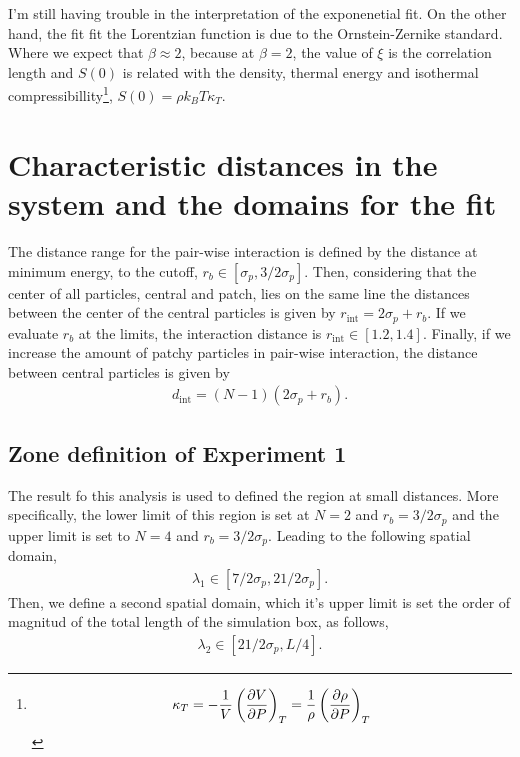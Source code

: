 \documentclass[a4paper]{tufte-handout} %
\begin{document}
I'm still having trouble in the interpretation of the exponenetial fit.
On the other hand, the fit fit the Lorentzian function is due to the Ornstein-Zernike standard.
Where we expect that $\beta \approx 2$, because at $\beta = 2$, the value of $\xi$ is the correlation length and $S(0)$ is related with the density, thermal energy and isothermal compressibillity\footnote{\[ \kappa_T = -\frac{1}{V}\left(\pdv{V}{P}\right)_T = \frac{1}{\rho}\left(\pdv{\rho}{P}\right)_T \]}, \( S(0) = \rho k_B T \kappa_T \).

\section{Characteristic distances in the system and the domains for the fit}
The distance range for the pair-wise interaction is defined by the distance at minimum energy, to the cutoff, \(r_{b}\in[\sigma_p,3/2\sigma_p]\).
Then, considering that the center of all particles, central and patch, lies on the same line the distances between the center of the central particles is given by \(r_{\mathrm{int}}=2\sigma_p+r_b\).
If we evaluate $r_b$ at the limits, the interaction distance is \(r_{\mathrm{int}}\in[1.2,1.4]\).
Finally, if we increase the amount of patchy particles in pair-wise interaction, the distance between central particles is given by
\begin{gather*}
        d_{\mathrm{int}} = \left(N-1\right)\left(2\sigma_p + r_b\right).
\end{gather*}

\subsection{Zone definition of Experiment 1}

The result fo this analysis is used to defined the region at small distances.
More specifically, the lower limit of this region is set at $N=2$ and $r_b=3/2\sigma_p$ and the upper limit is set to $N=4$ and $r_b=3/2\sigma_p$.
Leading to the following spatial domain,
\begin{gather*}
    \lambda_1\in\left[ 7/2\sigma_p,21/2\sigma_p \right].
\end{gather*}
Then, we define a second spatial domain, which it's upper limit is set the order of magnitud of the total length of the simulation box, as follows,
\begin{gather*}
    \lambda_2\in\left[ 21/2\sigma_p,L/4 \right].
\end{gather*}
\end{document}
